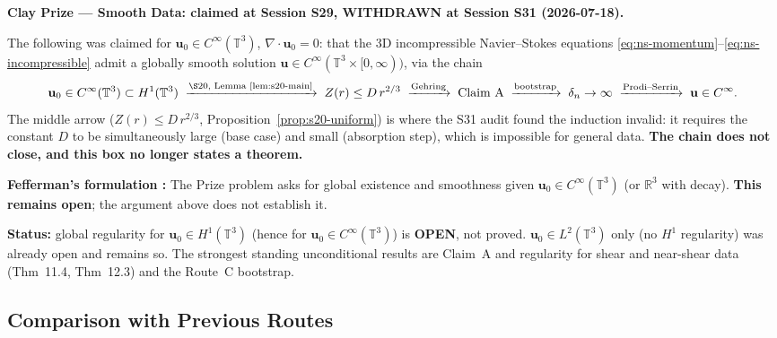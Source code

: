\documentclass[11pt, a4paper]{article}
\theoremstyle{definition}
\theoremstyle{remark}
\newenvironment{keyresult}{%
  \begin{tcolorbox}[colback=tfgreen!6, colframe=tfgreen!60!black,
    title=\textbf{Key Result}, fonttitle=\small\bfseries,
    breakable, left=4pt, right=4pt, top=4pt, bottom=4pt]
}{%
  \end{tcolorbox}
}
\begin{document}
\begin{keyresult}
\textbf{Clay Prize --- Smooth Data: claimed at Session S29, WITHDRAWN at Session S31 (2026-07-18).}

The following was claimed for $\mathbf{u}_0 \in C^\infty(\mathbb{T}^3)$,
$\nabla\cdot\mathbf{u}_0 = 0$: that the 3D incompressible Navier--Stokes
equations \eqref{eq:ns-momentum}--\eqref{eq:ns-incompressible} admit a
globally smooth solution $\mathbf{u}\in C^\infty(\mathbb{T}^3\times[0,\infty))$,
via the chain
\[
  \mathbf{u}_0 \in C^\infty(\mathbb{T}^3) \subset H^1(\mathbb{T}^3)
  \;\xrightarrow{\text{\S20, Lemma~\ref{lem:s20-main}}}\;
  Z(r)\leq D\,r^{2/3}
  \;\xrightarrow{\text{Gehring}}\;
  \text{Claim~A}
  \;\xrightarrow{\text{bootstrap}}\;
  \delta_n\to\infty
  \;\xrightarrow{\text{Prodi--Serrin}}\;
  \mathbf{u}\in C^\infty.
\]
The middle arrow ($Z(r)\leq D\,r^{2/3}$, Proposition~\ref{prop:s20-uniform})
is where the S31 audit found the induction invalid: it requires the constant
$D$ to be simultaneously large (base case) and small (absorption step),
which is impossible for general data. \textbf{The chain does not close, and
this box no longer states a theorem.}

\medskip
\noindent\textbf{Fefferman's formulation \cite{fefferman2000}:}
The Prize problem asks for global existence and smoothness given
$\mathbf{u}_0 \in C^\infty(\mathbb{T}^3)$ (or $\mathbb{R}^3$ with decay).
\textbf{This remains open}; the argument above does not establish it.

\medskip
\noindent\textbf{Status:} global regularity for $\mathbf{u}_0 \in H^1(\mathbb{T}^3)$
(hence for $\mathbf{u}_0\in C^\infty(\mathbb{T}^3)$) is \textbf{OPEN}, not proved.
$\mathbf{u}_0 \in L^2(\mathbb{T}^3)$ only (no $H^1$ regularity) was already open
and remains so. The strongest standing unconditional results are Claim~A and
regularity for shear and near-shear data (Thm~11.4, Thm~12.3) and the
Route~C bootstrap.
\end{keyresult}

\subsection{Comparison with Previous Routes}
\end{document}
